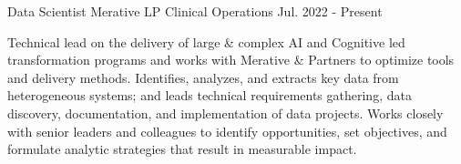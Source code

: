 

\begin{cventries}

  \cventry
    {Data Scientist} %
    {Merative LP}
    {Clinical Operations} %
    {Jul. 2022 - Present}
    {
      \begin{cvcompactparagraph}
        Technical lead on the delivery of large \& complex AI and Cognitive led transformation programs and works with Merative \& Partners to optimize tools and delivery methods.  Identifies, analyzes, and extracts key data from heterogeneous systems; and leads technical requirements gathering, data discovery, documentation, and implementation of data projects.  Works closely with senior leaders and colleagues to identify opportunities, set objectives, and formulate analytic strategies that result in measurable impact.
      \end{cvcompactparagraph}
    }


\end{cventries}
